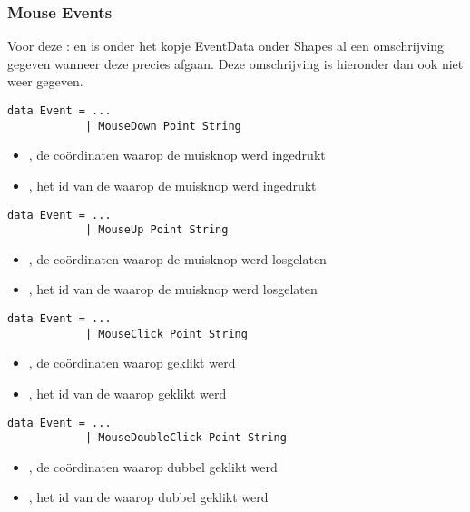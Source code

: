 \subsubsection{Mouse Events}
Voor deze \events:  en  is onder het kopje EventData onder Shapes al een omschrijving gegeven wanneer deze precies afgaan. Deze omschrijving is hieronder dan ook niet weer gegeven.

\begin{lstlisting}
data Event = ...
			| MouseDown Point String
\end{lstlisting}
\begin{itemize}
	\item {}, de coördinaten waarop de muisknop werd ingedrukt
	\item {}, het id van de \shape waarop de muisknop werd ingedrukt
\end{itemize}

\begin{lstlisting}
data Event = ...
			| MouseUp Point String
\end{lstlisting}
\begin{itemize}
	\item {}, de coördinaten waarop de muisknop werd losgelaten
	\item {}, het id van de \shape waarop de muisknop werd losgelaten
\end{itemize}

\begin{lstlisting}
data Event = ...
			| MouseClick Point String
\end{lstlisting}
\begin{itemize}
	\item {}, de coördinaten waarop geklikt werd
	\item {}, het id van de \shape waarop geklikt werd
\end{itemize}

\begin{lstlisting}
data Event = ...
			| MouseDoubleClick Point String
\end{lstlisting}
\begin{itemize}
	\item {}, de coördinaten waarop dubbel geklikt werd
	\item {}, het id van de \shape waarop dubbel geklikt werd
\end{itemize}

